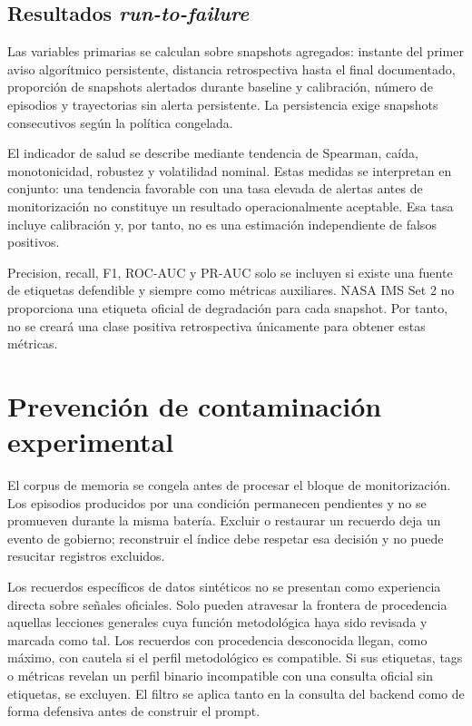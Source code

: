 \subsection{Resultados \textit{run-to-failure}}

Las variables primarias se calculan sobre snapshots agregados: instante del
primer aviso algorítmico persistente, distancia retrospectiva hasta el final
documentado, proporción de snapshots alertados durante baseline y calibración,
número de episodios y trayectorias sin alerta persistente. La persistencia exige
snapshots consecutivos según la política congelada.

El indicador de salud se describe mediante tendencia de Spearman, caída,
monotonicidad, robustez y volatilidad nominal. Estas medidas se interpretan en
conjunto: una tendencia favorable con una tasa elevada de alertas antes de
monitorización no constituye un resultado operacionalmente aceptable. Esa tasa
incluye calibración y, por tanto, no es una estimación independiente de falsos
positivos.

Precision, recall, F1, ROC-AUC y PR-AUC solo se incluyen si existe una fuente de
etiquetas defendible y siempre como métricas auxiliares. NASA IMS Set 2 no
proporciona una etiqueta oficial de degradación para cada snapshot. Por tanto,
no se creará una clase positiva retrospectiva únicamente para obtener estas
métricas.

\section{Prevención de contaminación experimental}

El corpus de memoria se congela antes de procesar el bloque de monitorización.
Los episodios producidos por una condición permanecen pendientes y no se
promueven durante la misma batería. Excluir o restaurar un recuerdo deja un
evento de gobierno; reconstruir el índice debe respetar esa decisión y no
puede resucitar registros excluidos.

Los recuerdos específicos de datos sintéticos no se presentan como experiencia
directa sobre señales oficiales. Solo pueden atravesar la frontera de
procedencia aquellas lecciones generales cuya función metodológica haya sido
revisada y marcada como tal. Los recuerdos con procedencia desconocida llegan,
como máximo, con cautela si el perfil metodológico es compatible. Si sus
etiquetas, tags o métricas revelan un perfil binario incompatible con una
consulta oficial sin etiquetas, se excluyen. El filtro se aplica tanto en la
consulta del backend como de forma defensiva antes de construir el prompt.

